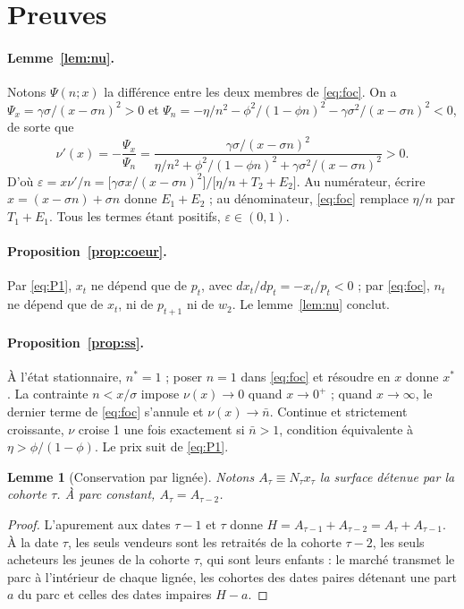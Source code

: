 \documentclass[11pt,a4paper]{article}
\theoremstyle{plain}
\newtheorem{lemme}{Lemme}
\theoremstyle{definition}
\theoremstyle{remark}
\newcommand{\eps}{\varepsilon}
\begin{document}
\appendix
\renewcommand{\theproposition}{A.\arabic{proposition}}
\renewcommand{\thelemme}{A.\arabic{lemme}}
\setcounter{proposition}{0}
\setcounter{lemme}{0}

\section{Preuves}\label{app:preuves}

\paragraph{Lemme~\ref{lem:nu}.} Notons $\Psi(n;x)$ la différence entre les deux membres de \eqref{eq:foc}. On a $\Psi_x = \gamma\sigma/(x-\sigma n)^2 > 0$ et $\Psi_n = -\eta/n^2 - \phi^2/(1-\phi n)^2 - \gamma\sigma^2/(x-\sigma n)^2 < 0$, de sorte que
\[
\nu'(x) = -\frac{\Psi_x}{\Psi_n} = \frac{\gamma\sigma/(x-\sigma n)^2}{\eta/n^2 + \phi^2/(1-\phi n)^2 + \gamma\sigma^2/(x-\sigma n)^2} > 0 .
\]
D'où $\eps = x\nu'/n = \big[\gamma\sigma x/(x-\sigma n)^2\big]\big/\big[\eta/n + T_2 + E_2\big]$. Au numérateur, écrire $x = (x-\sigma n) + \sigma n$ donne $E_1 + E_2$ ; au dénominateur, \eqref{eq:foc} remplace $\eta/n$ par $T_1 + E_1$. Tous les termes étant positifs, $\eps \in (0,1)$.

\paragraph{Proposition~\ref{prop:coeur}.} Par \eqref{eq:P1}, $x_t$ ne dépend que de $p_t$, avec $dx_t/dp_t = -x_t/p_t < 0$ ; par \eqref{eq:foc}, $n_t$ ne dépend que de $x_t$, ni de $p_{t+1}$ ni de $w_2$. Le lemme~\ref{lem:nu} conclut.

\paragraph{Proposition~\ref{prop:ss}.} À l'état stationnaire, $n^* = 1$ ; poser $n = 1$ dans \eqref{eq:foc} et résoudre en $x$ donne $x^*$. La contrainte $n < x/\sigma$ impose $\nu(x) \to 0$ quand $x \to 0^+$ ; quand $x \to \infty$, le dernier terme de \eqref{eq:foc} s'annule et $\nu(x) \to \bar n$. Continue et strictement croissante, $\nu$ croise 1 une fois exactement si $\bar n > 1$, condition équivalente à $\eta > \phi/(1-\phi)$. Le prix suit de \eqref{eq:P1}.

\begin{lemme}[Conservation par lignée]\label{lem:conservation}
Notons $A_\tau \equiv N_\tau x_\tau$ la surface détenue par la cohorte $\tau$. À parc constant, $A_\tau = A_{\tau-2}$.
\end{lemme}
\begin{proof}
L'apurement aux dates $\tau-1$ et $\tau$ donne $H = A_{\tau-1} + A_{\tau-2} = A_\tau + A_{\tau-1}$. À la date $\tau$, les seuls vendeurs sont les retraités de la cohorte $\tau-2$, les seuls acheteurs les jeunes de la cohorte $\tau$, qui sont leurs enfants : le marché transmet le parc à l'intérieur de chaque lignée, les cohortes des dates paires détenant une part $a$ du parc et celles des dates impaires $H - a$.
\end{proof}
\end{document}
